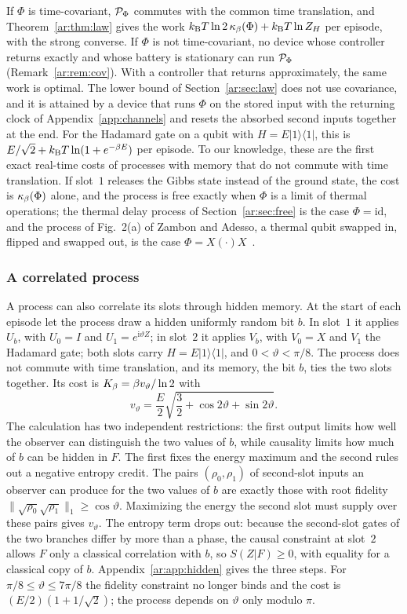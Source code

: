 If $\Phi$ is time-covariant, $\mathcal P_\Phi$ commutes with the common time translation, and Theorem~\ref{ar:thm:law} gives the work $k_{\mathrm B} T\ln2\,\kappa_\beta(\Phi)+k_{\mathrm B} T\ln Z_H$ per episode, with the strong converse. If $\Phi$ is not time-covariant, no device whose controller returns exactly and whose battery is stationary can run $\mathcal P_\Phi$ (Remark~\ref{ar:rem:cov}). With a controller that returns approximately, the same work is optimal. The lower bound of Section~\ref{ar:sec:law} does not use covariance, and it is attained by a device that runs $\Phi$ on the stored input with the returning clock of Appendix~\ref{app:channels} and resets the absorbed second inputs together at the end. For the Hadamard gate on a qubit with $H=E|1\rangle\langle1|$, this is $E/\sqrt2+k_{\mathrm B} T\ln(1+e^{-\beta E})$ per episode. To our knowledge, these are the first exact real-time costs of processes with memory that do not commute with time translation. If slot~$1$ releases the Gibbs state instead of the ground state, the cost is $\kappa_\beta(\Phi)$ alone, and the process is free exactly when $\Phi$ is a limit of thermal operations; the thermal delay process of Section~\ref{ar:sec:free} is the case $\Phi=\mathrm{id}$, and the process of Fig.~2(a) of Zambon and Adesso, a thermal qubit swapped in, flipped and swapped out, is the case $\Phi=X(\cdot)X$~\cite{ZambonAdesso}.

\subsubsection{A correlated process}

A process can also correlate its slots through hidden memory. At the start of each episode let the process draw a hidden uniformly random bit $b$. In slot~$1$ it applies $U_b$, with $U_0=I$ and $U_1=e^{\mathrm i\vartheta Z}$; in slot~$2$ it applies $V_b$, with $V_0=X$ and $V_1$ the Hadamard gate; both slots carry $H=E|1\rangle\langle1|$, and $0<\vartheta<\pi/8$. The process does not commute with time translation, and its memory, the bit $b$, ties the two slots together. Its cost is $K_\beta=\beta v_\vartheta/\ln2$ with
\[
v_\vartheta=\frac E2\sqrt{\frac32+\cos2\vartheta+\sin2\vartheta}.
\]
The calculation has two independent restrictions: the first output limits how well the observer can distinguish the two values of $b$, while causality limits how much of $b$ can be hidden in $F$. The first fixes the energy maximum and the second rules out a negative entropy credit. The pairs $(\rho_0,\rho_1)$ of second-slot inputs an observer can produce for the two values of $b$ are exactly those with root fidelity $\|\sqrt{\rho_0}\sqrt{\rho_1}\|_1\ge\cos\vartheta$. Maximizing the energy the second slot must supply over these pairs gives $v_\vartheta$. The entropy term drops out: because the second-slot gates of the two branches differ by more than a phase, the causal constraint at slot~$2$ allows $F$ only a classical correlation with $b$, so $S(Z|F)\ge0$, with equality for a classical copy of $b$. Appendix~\ref{ar:app:hidden} gives the three steps. For $\pi/8\le\vartheta\le7\pi/8$ the fidelity constraint no longer binds and the cost is $(E/2)(1+1/\sqrt2)$; the process depends on $\vartheta$ only modulo $\pi$.

